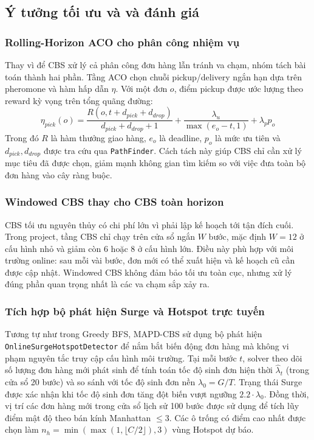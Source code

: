 \documentclass[conference]{IEEEtran}
\begin{document}
\subsection{Ý tưởng tối ưu và và đánh giá}
\subsubsection{Rolling-Horizon ACO cho phân công nhiệm vụ}
Thay vì để CBS xử lý cả phân công đơn hàng lẫn tránh va chạm, nhóm tách bài toán thành hai phần. Tầng ACO chọn chuỗi pickup/delivery ngắn hạn dựa trên pheromone và hàm hấp dẫn $\eta$. Với một đơn $o$, điểm pickup được ước lượng theo reward kỳ vọng trên tổng quãng đường:
\begin{equation}
\eta_{pick}(o) =
\frac{R(o, t + d_{pick} + d_{drop})}{d_{pick}+d_{drop}+1}
+ \frac{\lambda_u}{\max(e_o - t, 1)}
+ \lambda_p p_o
\end{equation}
Trong đó $R$ là hàm thưởng giao hàng, $e_o$ là deadline, $p_o$ là mức ưu tiên và $d_{pick}, d_{drop}$ được tra cứu qua \texttt{PathFinder}. Cách tách này giúp CBS chỉ cần xử lý mục tiêu đã được chọn, giảm mạnh không gian tìm kiếm so với việc đưa toàn bộ đơn hàng vào cây ràng buộc.

\subsubsection{Windowed CBS thay cho CBS toàn horizon}
CBS tối ưu nguyên thủy có chi phí lớn vì phải lập kế hoạch tới tận đích cuối. Trong project, tầng CBS chỉ chạy trên cửa sổ ngắn $W$ bước, mặc định $W=12$ ở cấu hình nhỏ và giảm còn $6$ hoặc $8$ ở cấu hình lớn. Điều này phù hợp với môi trường online: sau mỗi vài bước, đơn mới có thể xuất hiện và kế hoạch cũ cần được cập nhật. Windowed CBS không đảm bảo tối ưu toàn cục, nhưng xử lý đúng phần quan trọng nhất là các va chạm sắp xảy ra.

\subsubsection{Tích hợp bộ phát hiện Surge và Hotspot trực tuyến}
Tương tự như trong Greedy BFS, MAPD-CBS sử dụng bộ phát hiện \texttt{OnlineSurgeHotspotDetector} để nắm bắt biến động đơn hàng mà không vi phạm nguyên tắc truy cập cấu hình môi trường. Tại mỗi bước $t$, solver theo dõi số lượng đơn hàng mới phát sinh để tính toán tốc độ sinh đơn hiện thời $\hat{\lambda}_t$ (trong cửa sổ 20 bước) và so sánh với tốc độ sinh đơn nền $\lambda_0 = G/T$. Trạng thái Surge được xác nhận khi tốc độ sinh đơn tăng đột biến vượt ngưỡng $2.2 \cdot \lambda_0$. Đồng thời, vị trí các đơn hàng mới trong cửa sổ lịch sử 100 bước được sử dụng để tích lũy điểm mật độ theo bán kính Manhattan $\le 3$. Các ô trống có điểm cao nhất được chọn làm $n_h = \min(\max(1, \lfloor C/2 \rfloor), 3)$ vùng Hotspot dự báo.
\end{document}
